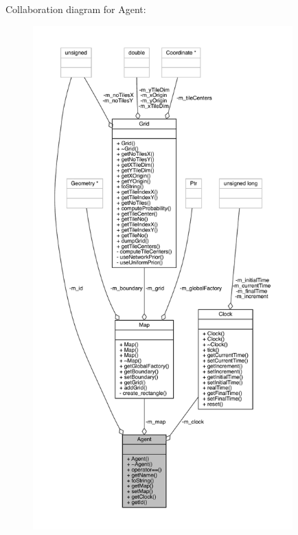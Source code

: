 Collaboration diagram for Agent\+:\nopagebreak
\begin{figure}[H]
\begin{center}
\leavevmode
\includegraphics[height=550pt]{class_agent__coll__graph}
\end{center}
\end{figure}

